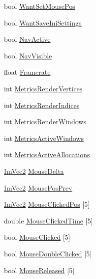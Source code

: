 \begin{DoxyCompactItemize}
bool \mbox{\hyperlink{struct_im_gui_i_o_a877f6adba2c961f361df7697f908649a}{Want\+Set\+Mouse\+Pos}}
\item 
bool \mbox{\hyperlink{struct_im_gui_i_o_a68d3fb726b3f243fa974107fae291d8e}{Want\+Save\+Ini\+Settings}}
\item 
bool \mbox{\hyperlink{struct_im_gui_i_o_aa63cf74a15e9dd0ad469ff09ca840ddf}{Nav\+Active}}
\item 
bool \mbox{\hyperlink{struct_im_gui_i_o_a904bb563ee00c92cc6b6b072df2c7405}{Nav\+Visible}}
\item 
float \mbox{\hyperlink{struct_im_gui_i_o_a8c6c2be54ddeda3cfb4a73cf95701a54}{Framerate}}
\item 
int \mbox{\hyperlink{struct_im_gui_i_o_a8ec9d203f4543047a8820366c5734529}{Metrics\+Render\+Vertices}}
\item 
int \mbox{\hyperlink{struct_im_gui_i_o_a19daed6a7fa22819fe187dfc2a2f5683}{Metrics\+Render\+Indices}}
\item 
int \mbox{\hyperlink{struct_im_gui_i_o_aec04d38a9b3799d12259a672c42e7c7e}{Metrics\+Render\+Windows}}
\item 
int \mbox{\hyperlink{struct_im_gui_i_o_ae47a71018cc9b0c7b55912a4bfa9149c}{Metrics\+Active\+Windows}}
\item 
int \mbox{\hyperlink{struct_im_gui_i_o_a206a2d9a6b3adf9503b4d4c40abc6f7a}{Metrics\+Active\+Allocations}}
\item 
\mbox{\hyperlink{struct_im_vec2}{Im\+Vec2}} \mbox{\hyperlink{struct_im_gui_i_o_a5b5cc0c171104337e3e7e13a8f7b0938}{Mouse\+Delta}}
\item 
\mbox{\hyperlink{struct_im_vec2}{Im\+Vec2}} \mbox{\hyperlink{struct_im_gui_i_o_a0fa6601a709eb9e34460e6abc7e77ad7}{Mouse\+Pos\+Prev}}
\item 
\mbox{\hyperlink{struct_im_vec2}{Im\+Vec2}} \mbox{\hyperlink{struct_im_gui_i_o_a23c9c6c48a51774fee36b7f0bb75d331}{Mouse\+Clicked\+Pos}} \mbox{[}5\mbox{]}
\item 
double \mbox{\hyperlink{struct_im_gui_i_o_afc5a5a5250fdee3c558f45c4f0268308}{Mouse\+Clicked\+Time}} \mbox{[}5\mbox{]}
\item 
bool \mbox{\hyperlink{struct_im_gui_i_o_a8655587202ff9001e5b0ccc6ade42d93}{Mouse\+Clicked}} \mbox{[}5\mbox{]}
\item 
bool \mbox{\hyperlink{struct_im_gui_i_o_a8bc01048733dc554de3d03f40f57b9ca}{Mouse\+Double\+Clicked}} \mbox{[}5\mbox{]}
\item 
bool \mbox{\hyperlink{struct_im_gui_i_o_a3a2e7d52289eecfdbe8571e034e41b53}{Mouse\+Released}} \mbox{[}5\mbox{]}

\end{DoxyCompactItemize}
